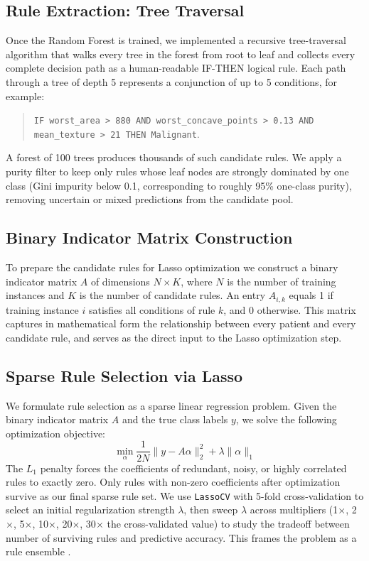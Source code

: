 \documentclass[11pt]{article}
\begin{document}
\subsection{Rule Extraction: Tree Traversal}

Once the Random Forest is trained, we implemented a recursive tree-traversal algorithm that walks every tree in the forest from root to leaf and collects every complete decision path as a human-readable IF-THEN logical rule. Each path through a tree of depth 5 represents a conjunction of up to 5 conditions, for example:
\begin{quote}
\small
\texttt{IF worst\_area > 880 AND worst\_concave\_points > 0.13 AND mean\_texture > 21 THEN Malignant}.
\end{quote}
A forest of 100 trees produces thousands of such candidate rules. We apply a purity filter to keep only rules whose leaf nodes are strongly dominated by one class (Gini impurity below 0.1, corresponding to roughly 95\% one-class purity), removing uncertain or mixed predictions from the candidate pool.

\subsection{Binary Indicator Matrix Construction}

To prepare the candidate rules for Lasso optimization we construct a binary indicator matrix $A$ of dimensions $N \times K$, where $N$ is the number of training instances and $K$ is the number of candidate rules. An entry $A_{i,k}$ equals 1 if training instance $i$ satisfies all conditions of rule $k$, and 0 otherwise. This matrix captures in mathematical form the relationship between every patient and every candidate rule, and serves as the direct input to the Lasso optimization step.

\subsection{Sparse Rule Selection via Lasso}

We formulate rule selection as a sparse linear regression problem. Given the binary indicator matrix $A$ and the true class labels $y$, we solve the following optimization objective:
\begin{equation}
\min_{\alpha} \frac{1}{2N} \| y - A\alpha \|_2^2 + \lambda \| \alpha \|_1
\end{equation}
The $L_1$ penalty forces the coefficients of redundant, noisy, or highly correlated rules to exactly zero. Only rules with non-zero coefficients after optimization survive as our final sparse rule set. We use \texttt{LassoCV} with 5-fold cross-validation to select an initial regularization strength $\lambda$, then sweep $\lambda$ across multipliers (1$\times$, 2$\times$, 5$\times$, 10$\times$, 20$\times$, 30$\times$ the cross-validated value) to study the tradeoff between number of surviving rules and predictive accuracy. This frames the problem as a rule ensemble \cite{friedman2008rule}.
\end{document}
